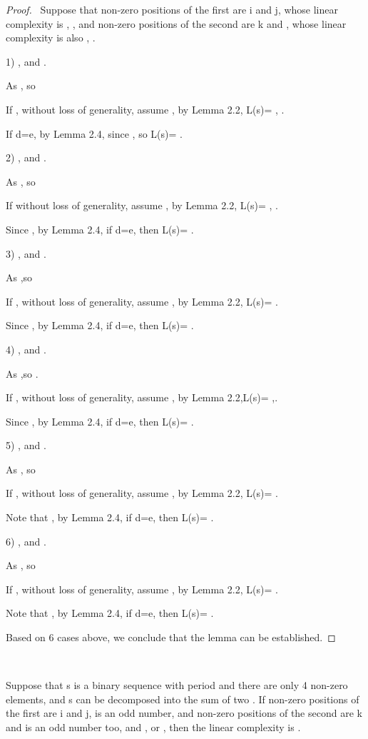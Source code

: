 \documentclass[10pt,conference,twocolumn]{IEEEtran}
\begin{document}
\begin{proof}\
 Suppose that non-zero positions of the first  are i and j, whose linear complexity is , ,
 and non-zero positions of the second  are k and , whose linear complexity is also , .

 1) , and .

As , so 

If , without loss of generality,
assume , by Lemma 2.2, L(s)= , .

 If d=e, by Lemma 2.4, since
, so L(s)= .

2) , and .

As , so 

 If  without loss of
generality, assume , by Lemma 2.2, L(s)= , .

Since , by Lemma 2.4, if d=e, then L(s)= .

3) , and .

As ,so 

If , without loss of generality,
assume , by Lemma 2.2, L(s)= .

Since , by Lemma 2.4, if d=e, then L(s)= .

4) , and .

As ,so .

 If , without loss
of generality, assume , by Lemma 2.2,L(s)= ,.

Since , by Lemma 2.4, if d=e, then L(s)= .

5) , and .

As , so 

 If , without
loss of generality, assume , by Lemma 2.2, L(s)= .

Note that , by Lemma 2.4, if d=e, then L(s)=
.

6) , and .

As , so 

 If , without loss of
generality, assume , by Lemma 2.2, L(s)= .

Note that , by Lemma 2.4, if d=e, then L(s)=
.

Based on 6 cases above, we conclude that the lemma can be
established.
\end{proof}\



 Suppose that s is a binary sequence
with period  and there are only 4 non-zero elements, and s can
be decomposed into the sum of two . If non-zero positions of
the first  are i and j,  is an odd number, and non-zero
positions of the second  are k and  is an odd number
too, and , or ,
then the linear complexity is .
\end{document}
